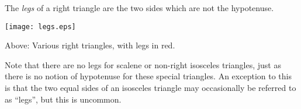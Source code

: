 \documentclass{article}
\begin{document}
The {\it legs} of a right triangle are the two sides which are not the hypotenuse.

\begin{center}

\texttt{[image: legs.eps]}

{\tiny Above: Various right triangles, with legs in red. }

\end{center}

Note that there are no legs for scalene or non-right isosceles triangles, just as there is no notion of hypotenuse for these special triangles.  An exception to this is that the two equal sides of an isosceles triangle may occasionally be referred to as ``legs'', but this is uncommon.
\end{document}

